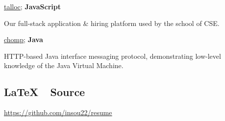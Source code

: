 \documentclass[a4paper]{deedy-resume}
\begin{document}
\begin{minipage}[t]{0.35\textwidth}
\vspace{6pt}

\href{https://cgi.cse.unsw.edu.au/~talloc/}
	{\underline{talloc}}; \textbf{ JavaScript}

Our full-stack application \& hiring platform
used by the school of CSE.

\vspace{6pt}

\href{https://github.com/insou22/chomp}
	{\underline{chomp}}; \textbf{ Java}

HTTP-based Java interface messaging protocol,
demonstrating low-level knowledge of the Java 
Virtual Machine.

\sectionspace


\vspace{0.3cm}
\subsection{\LaTeX \ \ Source}

\href{https://github.com/insou22/resume}
	{\underline{https://github.com/insou22/resume}}


\end{minipage}
\hfill
%
%
\end{document}
